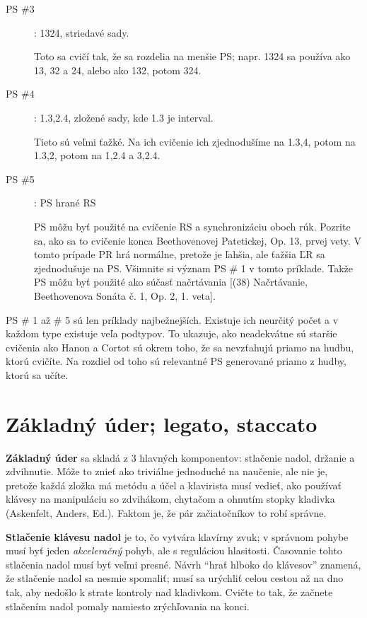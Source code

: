 \documentclass[11pt,a4paper]{book}
\begin{document}
\begin{description}
\item[PS \#3]: 1324, striedavé sady.

Toto sa cvičí tak, že sa rozdelia na menšie PS; napr. 1324 sa používa ako 13, 32 a 24, alebo ako 132, potom 324.

\item[PS \#4]: 1.3,2.4, zložené sady, kde 1.3 je interval.

Tieto sú veľmi ťažké. Na ich cvičenie ich zjednodušíme na 1.3,4, potom na 1.3,2, potom na 1,2.4 a 3,2.4.

\item[PS \#5]: PS hrané RS

PS môžu byť použité na cvičenie RS a synchronizáciu oboch rúk. Pozrite sa, ako sa to cvičenie konca Beethovenovej Patetickej, Op. 13, prvej vety. V tomto prípade PR hrá normálne, pretože je ľahšia, ale ťažšia ĽR sa zjednodušuje na PS. Všimnite si význam PS \# 1 v tomto príklade. Takže PS môžu byť použité ako súčasť načrtávania [(38) Načrtávanie, Beethovenova Sonáta č. 1, Op. 2, 1. veta].
\end{description}

PS \# 1 až \# 5 sú len príklady najbežnejších. Existuje ich neurčitý počet a v každom type existuje veľa podtypov. To ukazuje, ako neadekvátne sú staršie cvičenia ako Hanon a Cortot sú okrem toho, že sa nevzťahujú priamo na hudbu, ktorú cvičíte. Na rozdiel od toho sú relevantné PS generované priamo z hudby, ktorú sa učíte.

\section{Základný úder; legato, staccato}\label{s:basic-stroke}
\textbf{Základný úder} sa skladá z 3 hlavných komponentov: stlačenie nadol, držanie a zdvihnutie. Môže to znieť ako triviálne jednoduché na naučenie, ale nie je, pretože každá zložka má metódu a účel a klavirista musí vedieť, ako používať klávesy na manipuláciu so zdvihákom, chytačom a ohnutím stopky kladivka (Askenfelt, Anders, Ed.). Faktom je, že pár začiatočníkov to robí správne.

\textbf{Stlačenie klávesu nadol} je to, čo vytvára klavírny zvuk; v správnom pohybe musí byť jeden \emph{akceleračný} pohyb, ale s reguláciou hlasitosti. Časovanie tohto stlačenia nadol musí byť veľmi presné. Návrh “hrať hlboko do klávesov” znamená, že stlačenie nadol sa nesmie spomaliť; musí sa urýchliť celou cestou až na dno tak, aby nedošlo k strate kontroly nad kladivkom. Cvičte to tak, že začnete stlačením nadol pomaly namiesto zrýchľovania na konci.
\end{document}
